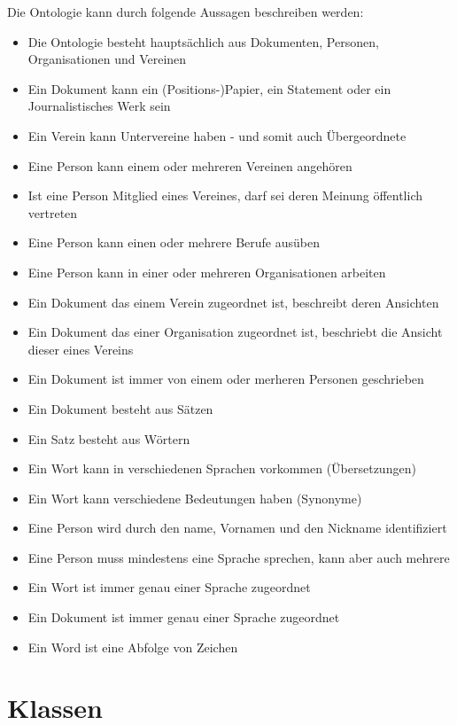 \documentclass[draft,
    11pt,
    latin1,
    a4paper,
    oneside
]{scrreprt}
\begin{document}
Die Ontologie kann durch folgende Aussagen beschreiben werden:

\begin{itemize}
  \item Die Ontologie besteht haupts\"achlich aus Dokumenten, Personen, Organisationen und Vereinen
  \item Ein Dokument kann ein (Positions-)Papier, ein Statement oder ein Journalistisches Werk sein
  \item Ein Verein kann Untervereine haben - und somit auch \"Ubergeordnete
  \item Eine Person kann einem oder mehreren Vereinen angeh\"oren
  \item Ist eine Person Mitglied eines Vereines, darf sei deren Meinung \"offentlich vertreten
  \item Eine Person kann einen oder mehrere Berufe aus\"uben
  \item Eine Person kann in einer oder mehreren Organisationen arbeiten
  \item Ein Dokument das einem Verein zugeordnet ist, beschreibt deren Ansichten
  \item Ein Dokument das einer Organisation zugeordnet ist, beschriebt die Ansicht dieser eines Vereins
  \item Ein Dokument ist immer von einem oder merheren Personen geschrieben
  \item Ein Dokument besteht aus S\"atzen
  \item Ein Satz besteht aus W\"ortern
  \item Ein Wort kann in verschiedenen Sprachen vorkommen (\"Ubersetzungen)
  \item Ein Wort kann verschiedene Bedeutungen haben (Synonyme)
  \item Eine Person wird durch den name, Vornamen und den Nickname identifiziert
  \item Eine Person muss mindestens eine Sprache sprechen, kann aber auch mehrere
  \item Ein Wort ist immer genau einer Sprache zugeordnet
  \item Ein Dokument ist immer genau einer Sprache zugeordnet
  \item Ein Word ist eine Abfolge von Zeichen
\end{itemize}

\section{Klassen} \label{sec:class}
\end{document}
